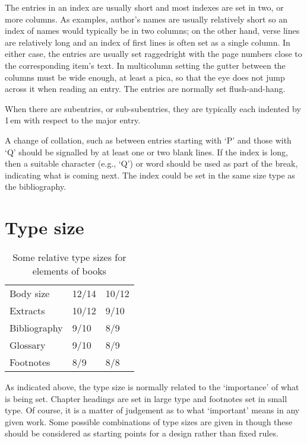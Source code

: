 \documentclass[10pt,a4paper,oneside,extrafontsizes]{memoir}%
\newcommand\U[2]{\textrm{#1}\,\textrm{#2}}
\begin{document}
\begin{paracol}{2}
\switchEng
    The entries in an index are usually short and most indexes
are set in two, or more columns. As examples, author's names are usually 
relatively short so an index of names would typically be in two columns;
on the other hand, verse lines are relatively long and an index of first lines
is often set as a single column. In either case, the entries are usually set 
raggedright with the page numbers close to the corresponding item's text.
In multicolumn setting the gutter between the columns must be wide enough,
at least a pica, so
that the eye does not jump across it when reading an entry. The entries are
normally set flush-and-hang.

    When there are subentries, or sub-subentries, they are typically
each indented by \U{1}{em} with respect to the major entry.

   A change of collation, such as between entries starting with `P' and those
with `Q' should be signalled by at least one or two blank lines. If the index
is long, then a suitable character (e.g., `Q') or word should be used as 
part of the break, indicating what is coming next. The index could be set
in the same size type as the bibliography.
\end{paracol}

\section{Type size}

\begin{table}
\centering
\caption{Some relative type sizes for elements of books}\label{tab:reltypesizing}
\begin{tabular}{lll} \toprule
Body size & 12/14  & 10/12 \\
Extracts  & 10/12 &  9/10 \\
Bibliography & 9/10 & 8/9 \\
Glossary     & 9/10 & 8/9 \\
Footnotes   & 8/9 & 8/8 \\
\bottomrule
\end{tabular}
\end{table}

\begin{paracol}{2}
\switchEng
    As indicated above, the type size is normally related to the `importance' 
of what is being set. Chapter headings are set in large type and footnotes 
set in small type. Of course, it is a matter of judgement as to what 
`important' means in any given work. Some possible combinations of type sizes
are given in  though these should be considered as
starting points for a design rather than fixed rules.
\end{paracol}
\end{document}
